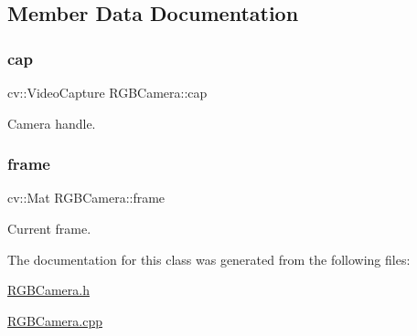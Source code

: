 \subsection{Member Data Documentation}
\hypertarget{class_r_g_b_camera_a941480d7209fdae8f0ac410cb6b90a63}{}\label{class_r_g_b_camera_a941480d7209fdae8f0ac410cb6b90a63} 
\subsubsection{\texorpdfstring{cap}{cap}}
{\footnotesize\ttfamily cv\+::\+Video\+Capture R\+G\+B\+Camera\+::cap\hspace{0.3cm}{\ttfamily [protected]}}



Camera handle. 

\hypertarget{class_r_g_b_camera_a81487c499dd5eee3c573ec6ed721ceba}{}\label{class_r_g_b_camera_a81487c499dd5eee3c573ec6ed721ceba} 
\subsubsection{\texorpdfstring{frame}{frame}}
{\footnotesize\ttfamily cv\+::\+Mat R\+G\+B\+Camera\+::frame\hspace{0.3cm}{\ttfamily [protected]}}



Current frame. 



The documentation for this class was generated from the following files\+:\begin{DoxyCompactItemize}
\item 
\hyperlink{_r_g_b_camera_8h}{R\+G\+B\+Camera.\+h}\item 
\hyperlink{_r_g_b_camera_8cpp}{R\+G\+B\+Camera.\+cpp}\end{DoxyCompactItemize}

